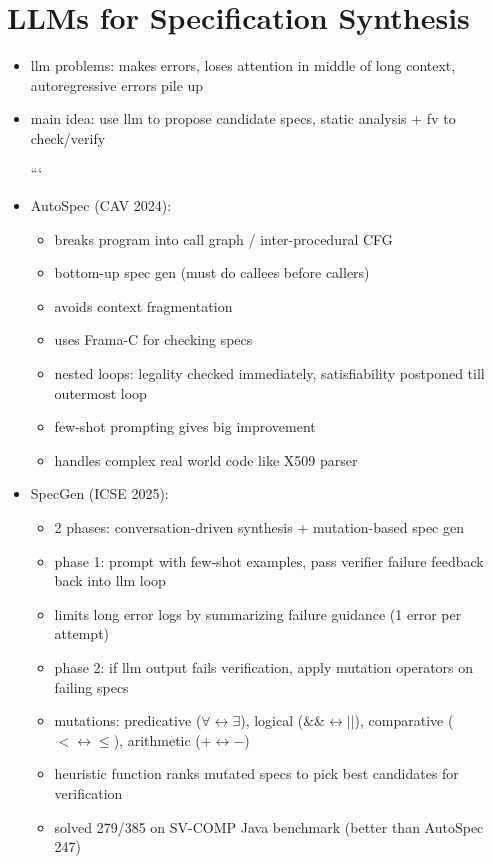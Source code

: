 
\setcounter{chapter}{4}
\chapter{LLMs for Specification Synthesis}

\begin{itemize}
\item llm problems: makes errors, loses attention in middle of long context, autoregressive errors pile up
\item main idea: use llm to propose candidate specs, static analysis + fv to check/verify

```
\item AutoSpec (CAV 2024):
\begin{itemize}
    \item breaks program into call graph / inter-procedural CFG
    \item bottom-up spec gen (must do callees before callers)
    \item avoids context fragmentation
    \item uses Frama-C for checking specs
    \item nested loops: legality checked immediately, satisfiability postponed till outermost loop
    \item few-shot prompting gives big improvement
    \item handles complex real world code like X509 parser
\end{itemize}

\item SpecGen (ICSE 2025):
\begin{itemize}
    \item 2 phases: conversation-driven synthesis + mutation-based spec gen
    \item phase 1: prompt with few-shot examples, pass verifier failure feedback back into llm loop
    \item limits long error logs by summarizing failure guidance (1 error per attempt)
    \item phase 2: if llm output fails verification, apply mutation operators on failing specs
    \item mutations: predicative ($\forall \leftrightarrow \exists$), logical ($\&\& \leftrightarrow \vert{}\vert{}$), comparative ($< \leftrightarrow \le$), arithmetic ($+ \leftrightarrow -$)
    \item heuristic function ranks mutated specs to pick best candidates for verification
    \item solved 279/385 on SV-COMP Java benchmark (better than AutoSpec 247)
\end{itemize}



\end{itemize}


